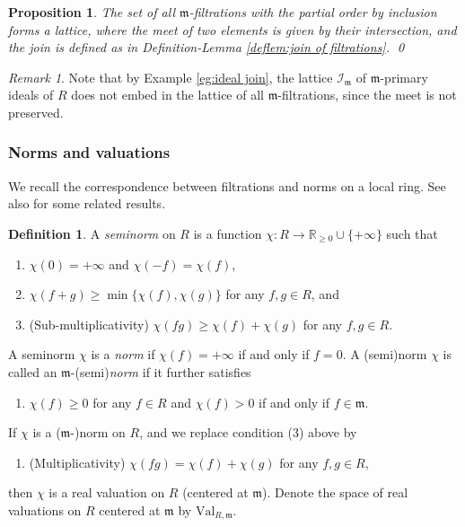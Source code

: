 \documentclass[11pt, leqno]{amsart}%
\theoremstyle{plain}
\newtheorem{proposition}[theorem]{Proposition}
\theoremstyle{definition}
\newtheorem{definition}[theorem]{Definition}
\theoremstyle{remark}
\newtheorem{remark}[theorem]{Remark}
\newcommand{\cI}{\mathcal{I}}
\newcommand{\bR}{\mathbb{R}}
\newcommand{\fa}{\mathfrak{a}}
\newcommand{\fb}{\mathfrak{b}}
\newcommand{\fm}{\mathfrak{m}}
\newcommand{\Val}{\mathrm{Val}}
\numberwithin{equation}{section}
\begin{document}
\begin{proposition}\label{prop:lattice}
    The set of all $\fm$-filtrations with the partial order by inclusion forms a lattice, where the meet of two elements is given by their intersection, and the join is defined as in Definition-Lemma \ref{deflem:join of filtrations}. \qed
\end{proposition}



\begin{remark}
    Note that by Example \ref{eg:ideal join}, the lattice $\cI_\fm$ of $\fm$-primary ideals of $R$ does not embed in the lattice of all $\fm$-filtrations, since the meet is not preserved.
\end{remark}





\subsubsection{Norms and valuations}\label{sssec:norms}

We recall the correspondence between filtrations and norms on a local ring. See also \cites{HS06,BFJ14} for some related results.

\begin{definition}\label{defn:norm}
    A \emph{seminorm} on $R$ is a function $\chi:R\to \bR_{\ge 0}\cup\{+\infty\}$ such that 
    \begin{enumerate}
        \item $\chi(0)=+\infty$ and $\chi(-f)=\chi(f)$, 
		
        \item $\chi(f+g)\ge \min\{\chi(f),\chi(g)\}$ for any $f,g\in R$, and
		
        \item(Sub-multiplicativity) $\chi(fg)\ge \chi(f)+\chi(g)$ for any $f,g\in R$. 
    \end{enumerate} 
	
    A seminorm $\chi$ is a \emph{norm} if $\chi(f)=+\infty$ if and only if $f=0$. A (semi)norm $\chi$ is called an $\fm$-(semi)\emph{norm} if it further satisfies
    \begin{enumerate}
        \item[(4)] $\chi(f)\ge 0$ for any $f\in R$ and $\chi(f)>0$ if and only if $f\in\fm$. 
    \end{enumerate}
	
    If $\chi$ is a ($\fm$-)norm on $R$, and we replace condition (3) above by
    \begin{enumerate}
        \item[(3$^\prime$)] (Multiplicativity) $\chi(fg)=\chi(f)+\chi(g)$ for any $f,g\in R$,
    \end{enumerate}
    then $\chi$ is a real valuation on $R$ (centered at $\fm$). Denote the space of real valuations on $R$ centered at $\fm$ by $\Val_{R,\fm}$. 
\end{definition}
\end{document}
